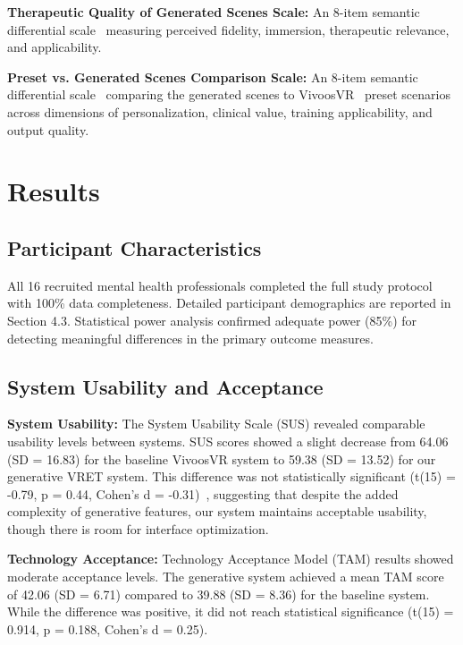 \documentclass[]{interact}
\begin{document}
\textbf{Therapeutic Quality of Generated Scenes Scale:} An 8-item semantic differential scale~\cite{osgood1957measurement} measuring perceived fidelity, immersion, therapeutic relevance, and applicability.

\textbf{Preset vs. Generated Scenes Comparison Scale:} An 8-item semantic differential scale~\cite{osgood1957measurement} comparing the generated scenes to VivoosVR~\cite{vivoosVR} preset scenarios across dimensions of personalization, clinical value, training applicability, and output quality.

\section{Results}

\subsection{Participant Characteristics}

All 16 recruited mental health professionals completed the full study protocol with 100\% data completeness. Detailed participant demographics are reported in Section 4.3. Statistical power analysis confirmed adequate power (85\%) for detecting meaningful differences in the primary outcome measures.

\subsection{System Usability and Acceptance}

\textbf{System Usability:} The System Usability Scale (SUS) revealed comparable usability levels between systems. SUS scores showed a slight decrease from 64.06 (SD = 16.83) for the baseline VivoosVR system to 59.38 (SD = 13.52) for our generative VRET system. This difference was not statistically significant (t(15) = -0.79, p = 0.44, Cohen's d = -0.31)~\cite{cohen2013statistical}, suggesting that despite the added complexity of generative features, our system maintains acceptable usability, though there is room for interface optimization.

\textbf{Technology Acceptance:} Technology Acceptance Model (TAM) results showed moderate acceptance levels. The generative system achieved a mean TAM score of 42.06 (SD = 6.71) compared to 39.88 (SD = 8.36) for the baseline system. While the difference was positive, it did not reach statistical significance (t(15) = 0.914, p = 0.188, Cohen's d = 0.25).
\end{document}
